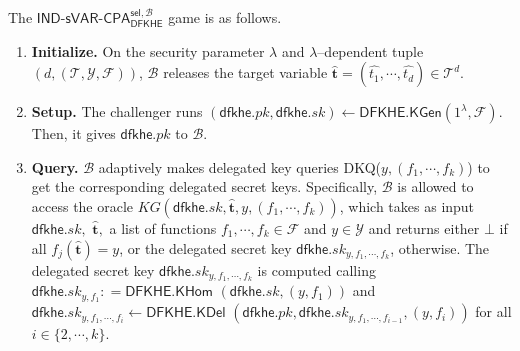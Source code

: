 \documentclass[runningheads,10pt]{llncs}
\begin{document}
The $\mathsf{IND}$-$\mathsf{sVAR}$-$\mathsf{CPA}^{\mathsf{sel},\mathcal{B}}_{\mathsf{DFKHE}}$ 
game  is as follows.
\begin{enumerate}
	\item \textbf{Initialize.} On the security parameter $\lambda$ and $\lambda$--dependent tuple $(d, (\mathcal{T}, \mathcal{Y}, \mathcal{F}))$,  $\mathcal{B}$ releases the target variable $\widehat{\mathbf{t}}=(\widehat{t_1}, \cdots, \widehat{t_d})\in \mathcal{T}^d$. 
	\item \textbf{Setup.} 
	The challenger runs $(\textsf{dfkhe}.pk, \textsf{dfkhe}.sk) \leftarrow \textsf{DFKHE.KGen}(1^\lambda, \mathcal{F} )$. Then, it gives $\textsf{dfkhe}.pk$ to $\mathcal{B}$.
	\item \textbf{Query.}   $\mathcal{B}$ adaptively makes delegated key queries DKQ($y,(f_1, \cdots, f_k)$) to get the corresponding delegated secret keys. 
	Specifically, $\mathcal{B}$ is allowed to access the oracle  $KG(\mathsf{dfkhe}.sk,\widehat{\mathbf{t}},y,(f_1, \cdots, f_k))$, which takes as input $\mathsf{dfkhe}.sk,$ $\widehat{\mathbf{t}},$ a list of functions $f_1, \cdots, f_k\in \mathcal{F}$ and $y\in \mathcal{Y}$ 
and returns either $\bot$ if all $f_j(\widehat{\mathbf{t}})=y$, 
or the delegated secret key $\mathsf{dfkhe}.sk_{y, f_1,\cdots, f_{k}}$, otherwise. 
The delegated secret key $\mathsf{dfkhe}.sk_{y, f_1,\cdots, f_{k}}$ is computed calling $\mathsf{dfkhe}.sk_{y, f_1}: =\mathsf{DFKHE.KHom}$ $(\mathsf{dfkhe}.sk, (y,f_1))$ and\\
   $\mathsf{dfkhe}.sk_{y, f_1,\cdots, f_{i}}\leftarrow \mathsf{DFKHE.KDel}$ $(\mathsf{dfkhe}.pk, \mathsf{dfkhe}.sk_{y, f_1,\cdots, f_{i-1}}, (y,f_{i} ))$ for all $i\in \{2, \cdots, k\}$.		
		


\end{enumerate}
\end{document}

